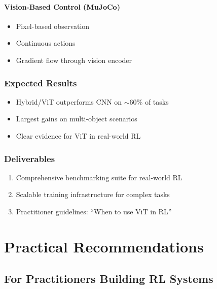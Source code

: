 \documentclass[12pt,a4paper,openany]{report}
\begin{document}
\subsubsection{Vision-Based Control (MuJoCo)}

\begin{itemize}
    \item Pixel-based observation
    \item Continuous actions
    \item Gradient flow through vision encoder
\end{itemize}

\subsection{Expected Results}

\begin{itemize}
    \item Hybrid/ViT outperforms CNN on $\sim 60\%$ of tasks
    \item Largest gains on multi-object scenarios
    \item Clear evidence for ViT in real-world RL
\end{itemize}

\subsection{Deliverables}

\begin{enumerate}
    \item Comprehensive benchmarking suite for real-world RL
    \item Scalable training infrastructure for complex tasks
    \item Practitioner guidelines: ``When to use ViT in RL''
\end{enumerate}

\chapter{Practical Recommendations}

\section{For Practitioners Building RL Systems}
\end{document}
